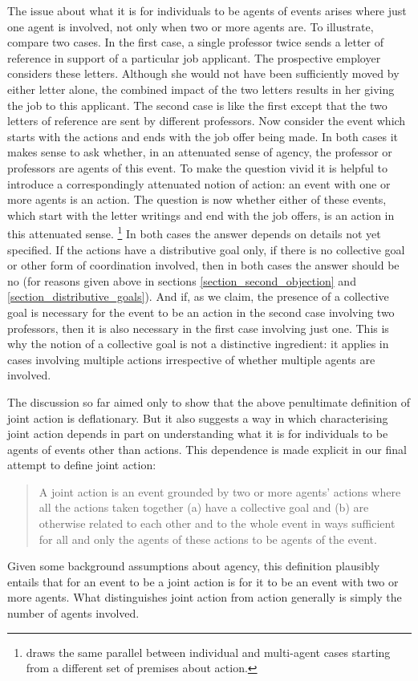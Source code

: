 \documentclass[12pt,a4paper]{extarticle}
\begin{document}
The issue about what it is for individuals to be agents of events  arises where just one agent is involved, not only when two or more agents are.
To illustrate, compare two cases.
In the first case, a single professor twice sends a letter of reference in support of a particular job applicant.
The prospective employer considers these letters.
Although she would not have been sufficiently moved by either letter alone, the combined impact of the two letters results in her giving the job to this applicant.
The second case is like the first  except that the two letters of reference are sent by different professors.
Now consider the event which starts with the actions and ends with the job offer being made.
In both cases it makes sense to ask whether, in an attenuated sense of agency, the professor or professors are agents of this event.
To make the question vivid it is helpful to introduce a correspondingly attenuated notion of action: 
	an event with one or more agents is an action.
The question is now whether either of these events, which start with the letter writings and end with the job offers, is an action in this attenuated sense.%
\footnote{
\citet{chant_special_2006} draws the same parallel between individual and multi-agent cases starting from a different set of premises about action.
}
In both cases the answer depends on details not yet specified.
If the actions have a distributive goal only, if there is no collective goal or other form of coordination involved, then in both cases the answer should be no (for reasons given above in sections \ref{section_second_objection} and \ref{section_distributive_goals}).
And if, as we claim, the presence of a collective goal is necessary for the event to be an action in the second case involving two professors, then it is also necessary in the first case involving just one.
This is why the notion of a collective goal is not a distinctive ingredient: it applies in cases involving multiple actions irrespective of whether multiple agents are involved.

The discussion so far aimed only to show that the above penultimate definition of joint action is deflationary.
But it also suggests a way in which 
	characterising joint action
	depends in part on 
	understanding what it is for individuals to be agents of events other than   actions.
This dependence is made explicit in our final attempt to define joint action:
%
\begin{quote}
	A joint action 
	\label{df_joint_action_final}
	is an event grounded by two or more agents' actions 
	where all the actions taken together 
	(a) have a collective goal 
	and 
	(b) are otherwise related to each other and to the whole event in ways  sufficient for all and only the agents of these actions to be  agents of the event.
\end{quote}
%
Given some background assumptions about agency, this definition plausibly entails that for an event to be a joint action is for it to be an event with two or more agents.
What distinguishes joint action from action generally is simply the number of agents involved. 
\end{document}
